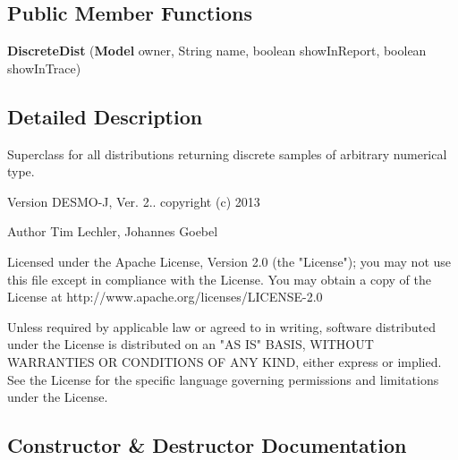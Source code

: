 \subsection*{Public Member Functions}
\begin{DoxyCompactItemize}
\item 
{\bf Discrete\-Dist} ({\bf Model} owner, String name, boolean show\-In\-Report, boolean show\-In\-Trace)
\end{DoxyCompactItemize}


\subsection{Detailed Description}
Superclass for all distributions returning discrete samples of arbitrary numerical type.

\begin{DoxyVersion}{Version}
D\-E\-S\-M\-O-\/\-J, Ver. 2.. copyright (c) 2013 
\end{DoxyVersion}
\begin{DoxyAuthor}{Author}
Tim Lechler, Johannes Goebel \begin{DoxyVerb}    Licensed under the Apache License, Version 2.0 (the "License"); you
    may not use this file except in compliance with the License. You may
    obtain a copy of the License at
    http://www.apache.org/licenses/LICENSE-2.0

    Unless required by applicable law or agreed to in writing, software
    distributed under the License is distributed on an "AS IS" BASIS,
    WITHOUT WARRANTIES OR CONDITIONS OF ANY KIND, either express or
    implied. See the License for the specific language governing
    permissions and limitations under the License.\end{DoxyVerb}
 
\end{DoxyAuthor}


\subsection{Constructor \& Destructor Documentation}

